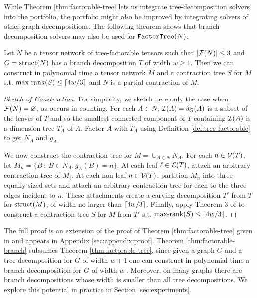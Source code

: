 While Theorem \ref{thm:factorable-tree} lets us integrate tree-decomposition solvers into the portfolio, the portfolio might also be improved by integrating solvers of other graph decompositions. The following theorem shows that branch-decomposition solvers may also be used for $\texttt{\upshape FactorTree}(N)$:
\begin{theorem} \label{thm:factorable-branch}
Let $N$ be a tensor network of tree-factorable tensors such that $|\mathcal{F}(N)| \leq 3$ and $G=\text{struct}(N)$ has a branch decomposition $T$ of width $w \geq 1$. Then we can construct in polynomial time a tensor network $M$ and a contraction tree $S$ for $M$ s.t. $\text{max-rank}(S) \leq \lceil4w/3\rceil$ and $N$ is a partial contraction of $M$.
\end{theorem}
\begin{proof}[Sketch of Construction]
For simplicity, we sketch here only the case when $\mathcal{F}(N) = \varnothing$, as occurs in counting. For each $A \in N$, $\mathcal{I}(A) = \delta_{G}(A)$ is a subset of the leaves of $T$ and so the smallest connected component of $T$ containing $\mathcal{I}(A)$ is a dimension tree $T_A$ of $A$. Factor $A$ with $T_A$ using Definition \ref{def:tree-factorable} to get $N_A$ and $g_A$.

We now construct the contraction tree for $M = \cup_{A \in N} N_A$. For each $n \in \mathcal{V}(T)$, let $M_n = \{B~:~B \in N_A, g_A(B) = n\}$. At each leaf $\ell \in \mathcal{L}(T)$, attach an arbitrary contraction tree of $M_\ell$. At each non-leaf $n \in \mathcal{V}(T)$, partition $M_n$ into three equally-sized sets and attach an arbitrary contraction tree for each to the three edges incident to $n$. These attachments create a carving decomposition $T'$ from $T$ for $\text{struct}(M)$, of width no larger than $\lceil4w/3\rceil$. Finally, apply Theorem 3 of \cite{DDV19} to construct a contraction tree $S$ for $M$ from $T'$ s.t. $\text{max-rank}(S) \leq \lceil4w/3\rceil$.
\end{proof}

The full proof is an extension of the proof of Theorem \ref{thm:factorable-tree} given in \cite{DDV19} and appears in Appendix \ref{sec:appendix:proof}.
Theorem \ref{thm:factorable-branch} subsumes Theorem \ref{thm:factorable-tree}, since given a graph $G$ and a tree decomposition for $G$ of width $w+1$ one can construct in polynomial time a branch decomposition for $G$ of width $w$ \cite{RS91}. Moreover, on many graphs there are branch decompositions whose width is smaller than all tree decompositions. We explore this potential in practice in Section \ref{sec:experiments}.

